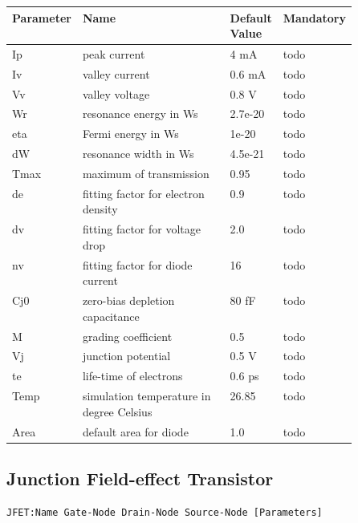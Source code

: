 \begin{tabular}{|l|p{0.5\linewidth}|l|l|}
\hline
Parameter & Name & Default Value & Mandatory \\
\hline
Ip & peak current & 4 mA & todo \\
Iv & valley current & 0.6 mA & todo \\
Vv & valley voltage & 0.8 V & todo \\
Wr & resonance energy in Ws & 2.7e-20 & todo \\
eta & Fermi energy in Ws & 1e-20 & todo \\
dW & resonance width in Ws & 4.5e-21 & todo \\
Tmax & maximum of transmission & 0.95 & todo \\
de & fitting factor for electron density & 0.9 & todo \\
dv & fitting factor for voltage drop & 2.0 & todo \\
nv & fitting factor for diode current & 16 & todo \\
Cj0 & zero-bias depletion capacitance & 80 fF & todo \\
M & grading coefficient & 0.5 & todo \\
Vj & junction potential & 0.5 V & todo \\
te & life-time of electrons & 0.6 ps & todo \\
Temp & simulation temperature in degree Celsius & 26.85 & todo \\
Area & default area for diode & 1.0 & todo \\
\hline
\end{tabular}


\subsection{Junction Field-effect Transistor}

\begin{verbatim}
JFET:Name Gate-Node Drain-Node Source-Node [Parameters]
\end{verbatim}


